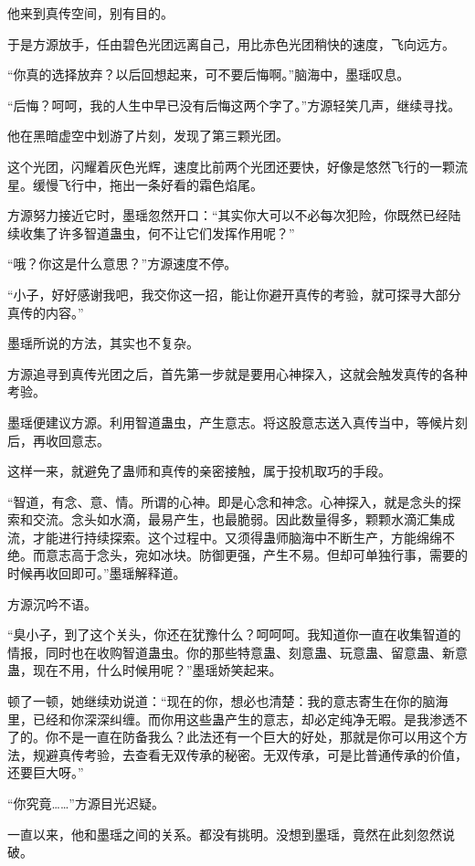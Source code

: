\begin{this_body}
他来到真传空间，别有目的。

于是方源放手，任由碧色光团远离自己，用比赤色光团稍快的速度，飞向远方。

“你真的选择放弃？以后回想起来，可不要后悔啊。”脑海中，墨瑶叹息。

“后悔？呵呵，我的人生中早已没有后悔这两个字了。”方源轻笑几声，继续寻找。

他在黑暗虚空中划游了片刻，发现了第三颗光团。

这个光团，闪耀着灰色光辉，速度比前两个光团还要快，好像是悠然飞行的一颗流星。缓慢飞行中，拖出一条好看的霜色焰尾。

方源努力接近它时，墨瑶忽然开口：“其实你大可以不必每次犯险，你既然已经陆续收集了许多智道蛊虫，何不让它们发挥作用呢？”

“哦？你这是什么意思？”方源速度不停。

“小子，好好感谢我吧，我交你这一招，能让你避开真传的考验，就可探寻大部分真传的内容。”

墨瑶所说的方法，其实也不复杂。

方源追寻到真传光团之后，首先第一步就是要用心神探入，这就会触发真传的各种考验。

墨瑶便建议方源。利用智道蛊虫，产生意志。将这股意志送入真传当中，等候片刻后，再收回意志。

这样一来，就避免了蛊师和真传的亲密接触，属于投机取巧的手段。

“智道，有念、意、情。所谓的心神。即是心念和神念。心神探入，就是念头的探索和交流。念头如水滴，最易产生，也最脆弱。因此数量得多，颗颗水滴汇集成流，才能进行持续探索。这个过程中。又须得蛊师脑海中不断生产，方能绵绵不绝。而意志高于念头，宛如冰块。防御更强，产生不易。但却可单独行事，需要的时候再收回即可。”墨瑶解释道。

方源沉吟不语。

“臭小子，到了这个关头，你还在犹豫什么？呵呵呵。我知道你一直在收集智道的情报，同时也在收购智道蛊虫。你的那些特意蛊、刻意蛊、玩意蛊、留意蛊、新意蛊，现在不用，什么时候用呢？”墨瑶娇笑起来。

顿了一顿，她继续劝说道：“现在的你，想必也清楚：我的意志寄生在你的脑海里，已经和你深深纠缠。而你用这些蛊产生的意志，却必定纯净无暇。是我渗透不了的。你不是一直在防备我么？此法还有一个巨大的好处，那就是你可以用这个方法，规避真传考验，去查看无双传承的秘密。无双传承，可是比普通传承的价值，还要巨大呀。”

“你究竟……”方源目光迟疑。

一直以来，他和墨瑶之间的关系。都没有挑明。没想到墨瑶，竟然在此刻忽然说破。


\end{this_body}
